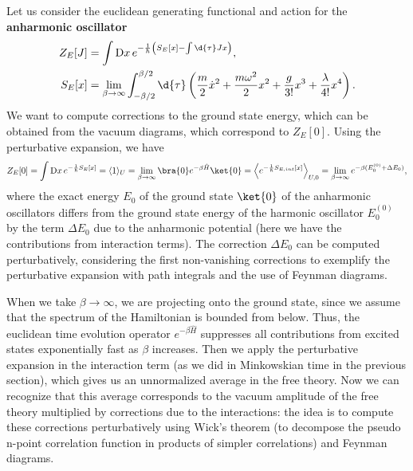 Let us consider the euclidean generating functional and action for the \textbf{anharmonic oscillator}
\[
    \begin{aligned}
        Z_E[J] & = \int \mathrm{D}x\, e^{-\frac{1}{\hbar}\left(S_E[x]-\int \d{\tau} J x\right)},                                                                                          \\
        S_E[x] & = \lim_{\beta \to \infty} \int_{-\beta/2}^{\beta/2} \d{\tau} \left( \frac{m}{2} \dot{x}^2 + \frac{m\omega^2}{2} x^2 + \frac{g}{3!} x^3 + \frac{\lambda}{4!} x^4 \right).
    \end{aligned}
\]
We want to compute corrections to the ground state energy, which can be obtained from the vacuum diagrams, which correspond to \(Z_E[0]\). Using the perturbative expansion, we have
\[
    \begin{aligned}
        Z_E[0] = \int \mathrm{D}x\, e^{-\frac{1}{\hbar}S_{E}[x]} = \langle 1 \rangle_{U} = \lim_{\beta \to \infty} \bra{0} e^{-\beta \hat{H}} \ket{0} = \left\langle e^{-\frac{1}{\hbar} S_{E, int}[x]} \right\rangle_{U,0} = \lim_{\beta \to \infty} e^{-\beta (E_0^{(0)}+ \Delta E_0)},
    \end{aligned}
\]
where the exact energy \(E_0\) of the ground state \(\ket{0}\) of the anharmonic oscillators differs from the ground state energy of the harmonic oscillator \(E_0^{(0)}\) by the term \(\Delta E_0\) due to the anharmonic potential (here we have the contributions from interaction terms). The correction \(\Delta E_0\) can be computed perturbatively, considering the first non-vanishing corrections to exemplify the perturbative expansion with path integrals and the use of Feynman diagrams.

When we take \(\beta \to \infty\), we are projecting onto the ground state, since we assume that the spectrum of the Hamiltonian is bounded from below. Thus, the euclidean time evolution operator \(e^{-\beta \hat{H}}\) suppresses all contributions from excited states exponentially fast as \(\beta\) increases. Then we apply the perturbative expansion in the interaction term (as we did in Minkowskian time in the previous section), which gives us an unnormalized average in the free theory. Now we can recognize that this average corresponds to the vacuum amplitude of the free theory multiplied by corrections due to the interactions: the idea is to compute these corrections perturbatively using Wick’s theorem (to decompose the pseudo n-point correlation function in products of simpler correlations) and Feynman diagrams.

